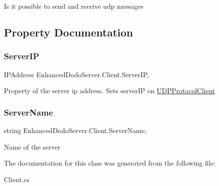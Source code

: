Is it possible to send and receive udp messages 



\subsection{Property Documentation}
\mbox{\label{class_enhanced_dodo_server_1_1_client_ab0401654a3ee99fab881203f2786ecf8}} 
\subsubsection{\texorpdfstring{ServerIP}{ServerIP}}
{\footnotesize\ttfamily I\+P\+Address Enhanced\+Dodo\+Server.\+Client.\+Server\+IP\hspace{0.3cm}{\ttfamily [get]}, {\ttfamily [set]}}



Property of the server ip address. Sets server\+IP on \mbox{\hyperlink{class_enhanced_dodo_server_1_1_u_d_p_protocol_client}{U\+D\+P\+Protocol\+Client}} 

\mbox{\label{class_enhanced_dodo_server_1_1_client_a4a278205ef0a67200187552f8024b31c}} 
\subsubsection{\texorpdfstring{ServerName}{ServerName}}
{\footnotesize\ttfamily string Enhanced\+Dodo\+Server.\+Client.\+Server\+Name\hspace{0.3cm}{\ttfamily [get]}, {\ttfamily [set]}}



Name of the server 



The documentation for this class was generated from the following file\+:\begin{DoxyCompactItemize}
\item 
Client.\+cs\end{DoxyCompactItemize}
